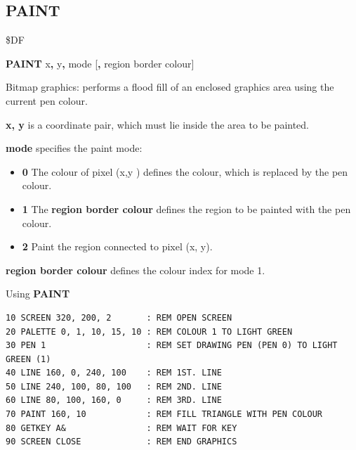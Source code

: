 
\newpage
\subsection{PAINT}
\begin{description}[leftmargin=2cm,style=nextline]
\item [Token:]    \$DF

\item [Format:]   {\bf PAINT} x{\bf,} y{\bf,} mode [{\bf,} region border colour]

\item [Usage:]    Bitmap graphics: performs a flood fill of an enclosed graphics area using the current pen colour.

                  {\bf x, y} is a coordinate pair, which must lie inside the area to be painted.

                  {\bf mode} specifies the paint mode:
                  \begin{itemize}
                     \item {\bf 0} The colour of pixel (x,y ) defines the colour, which is replaced by the pen colour.
                     \item {\bf 1} The {\bf region border colour} defines the region to be painted with the pen colour.
                     \item {\bf 2} Paint the region connected to pixel (x, y).
                  \end{itemize}

                  {\bf region border colour} defines the colour index for mode 1.

\item [Example:]  Using {\bf PAINT}

\begin{tcolorbox}[colback=black,coltext=white]
\verbatimfont{\codefont}
\begin{verbatim}
10 SCREEN 320, 200, 2       : REM OPEN SCREEN
20 PALETTE 0, 1, 10, 15, 10 : REM COLOUR 1 TO LIGHT GREEN
30 PEN 1                    : REM SET DRAWING PEN (PEN 0) TO LIGHT GREEN (1)
40 LINE 160, 0, 240, 100    : REM 1ST. LINE
50 LINE 240, 100, 80, 100   : REM 2ND. LINE
60 LINE 80, 100, 160, 0     : REM 3RD. LINE
70 PAINT 160, 10            : REM FILL TRIANGLE WITH PEN COLOUR
80 GETKEY A&                : REM WAIT FOR KEY
90 SCREEN CLOSE             : REM END GRAPHICS
\end{verbatim}
\end{tcolorbox}
\end{description}

